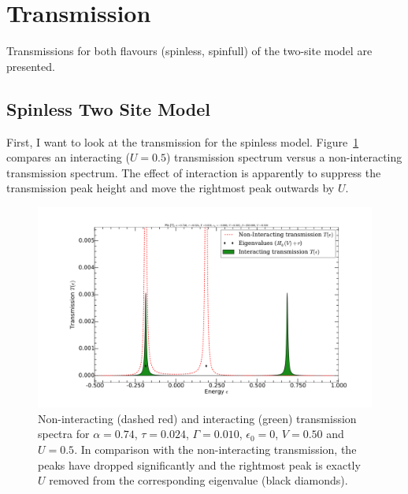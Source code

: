 \clearpage\section{Transmission}
\label{sec:twositetransmission}
Transmissions for both flavours (spinless, spinfull) of the two-site model are presented. 
\subsection{Spinless Two Site Model}
First, I want to look at the transmission for the spinless model. Figure~\ref{fig:spinlesstransmission} compares an interacting ($U=0.5$) transmission spectrum versus a non-interacting transmission spectrum. The effect of interaction is apparently to suppress the transmission peak height and move the rightmost peak outwards by $U$. 
\begin{figure}[htb]
    \centering
    \includegraphics[height=.35\textheight,clip=true,trim=5cm 2cm 4cm 3cm]{pdf/isbetter.pdf}
    \caption{Non-interacting (dashed red) and interacting (green) transmission spectra for $\alpha=0.74$, $\tau=0.024$, $\Gamma=0.010$, $\epsilon_0 = 0$, $V=0.50$ and $U=0.5$. In comparison with the non-interacting transmission, the peaks have dropped significantly and the rightmost peak is exactly $U$ removed from the corresponding eigenvalue (black diamonds).}
    \label{fig:spinlesstransmission}
\end{figure}

